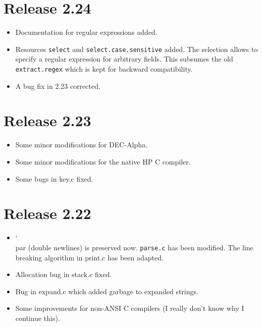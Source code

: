 \documentclass[11pt,a4paper]{scrartcl}
\newcommand\rsc[1]{\texttt{#1}}
\newcommand\File[1]{\textsf{#1}}
\newenvironment{Release}[2]{%
  \def\tmp{#2}%
  \section*{Release #1 \ifx\tmp\empty\else{\normalsize[#2]}\fi}
  \begin{itemize}
}{\end{itemize}}
\newenvironment{Fix}[1]{\item }{}
\newenvironment{New}[1]{\item }{}
\newenvironment{Doc}[1]{\item }{}
\newenvironment{Update}[1]{\item }{}
\newcommand\BS{\char`\\}
\begin{document}
\begin{multicols}
 \begin{Release}{2.24}{}
  \begin{Doc}{gene}
    Documentation for regular expressions added.
  \end{Doc}
  \begin{New}{gene}
    Resources \rsc{select} and
    \rsc{select.case.sensitive} added. The selection allows to
    specify a regular expression for arbitrary fields. This subsumes
    the old \rsc{extract.regex} which is kept for backward
    compatibility.
  \end{New}
  \begin{Fix}{gene}
    A bug fix in 2.23 corrected.
  \end{Fix}
 \end{Release}

 \begin{Release}{2.23}{}
  \begin{Update}{gene}
    Some minor modifications for DEC-Alpha.
  \end{Update}
  \begin{Update}{gene}
    Some minor modifications for the native HP C compiler.
  \end{Update}
  \begin{Fix}{gene}
    Some bugs in \File{key.c} fixed.
  \end{Fix}
 \end{Release}

 \begin{Release}{2.22}{}
  \begin{Update}{gene}
    \BS par (double newlines) is preserved now. \rsc{parse.c}
    has been modified. The line breaking algorithm in \File{print.c}
    has been adapted.
  \end{Update}
  \begin{Fix}{gene}
    Allocation bug in \File{stack.c} fixed.
  \end{Fix}
  \begin{Fix}{gene}
    Bug in \File{expand.c} which added garbage to expanded strings.
  \end{Fix}
  \begin{Update}{gene}
    Some improvements for non-ANSI C compilers (I really don't know
    why I continue this).
  \end{Update}
 \end{Release}


\end{multicols}
\end{document}
